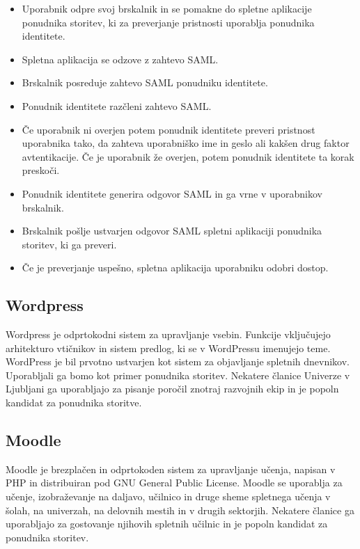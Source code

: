 \documentclass[a4paper,12pt,openright]{book}
\begin{document}
\begin{itemize}
    \item Uporabnik odpre svoj brskalnik in se pomakne do spletne aplikacije ponudnika storitev, ki za preverjanje pristnosti uporablja ponudnika identitete.
    \item Spletna aplikacija se odzove z zahtevo SAML.
    \item Brskalnik posreduje zahtevo SAML ponudniku identitete.
    \item Ponudnik identitete razčleni zahtevo SAML.
    \item Če uporabnik ni overjen potem ponudnik identitete preveri pristnost uporabnika tako, da zahteva uporabniško ime in geslo ali kakšen drug faktor avtentikacije. Če je uporabnik že overjen, potem ponudnik identitete ta korak preskoči.
    \item Ponudnik identitete generira odgovor SAML in ga vrne v uporabnikov brskalnik.
    \item Brskalnik pošlje ustvarjen odgovor SAML spletni aplikaciji ponudnika storitev, ki ga preveri.
    \item Če je preverjanje uspešno, spletna aplikacija uporabniku odobri dostop.
\end{itemize}
\subsection{Wordpress}
Wordpress\cite{wordpress} je odprtokodni sistem za upravljanje vsebin. Funkcije vključujejo arhitekturo vtičnikov in sistem predlog, ki se v WordPressu imenujejo teme. WordPress je bil prvotno ustvarjen kot sistem za objavljanje spletnih dnevnikov.
\newline
Uporabljali ga bomo kot primer ponudnika storitev. Nekatere članice Univerze v Ljubljani ga uporabljajo za pisanje poročil znotraj razvojnih ekip in je popoln kandidat za ponudnika storitve. 
\subsection{Moodle}
Moodle\cite{Moodle} je brezplačen in odprtokoden sistem za upravljanje učenja, napisan v PHP in distribuiran pod GNU General Public License. Moodle se uporablja za učenje, izobraževanje na daljavo, učilnico in druge sheme spletnega učenja v šolah, na univerzah, na delovnih mestih in v drugih sektorjih.
\newline
Nekatere članice ga uporabljajo za gostovanje njihovih spletnih učilnic in je popoln kandidat za ponudnika storitev.
\end{document}
